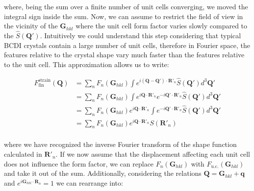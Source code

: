 where, being the sum over a finite number of unit cells converging, we moved the integral sign inside the sum. 
Now, we can assume to restrict the field of view in the vicinity of the $\mathbf{G}_{hkl}$ where the unit cell 
form factor varies slowly compared to the $\widehat{S}(\mathbf{Q'})$. Intuitively we could understand this step considering 
that typical BCDI crystals contain a large number of unit cells, therefore in Fourier space, the features relative to 
the crystal shape vary much faster than the features relative to the unit cell. This approximation allows us to write:

\begin{equation}
    \begin{aligned}
    F^{\text{strain}}_{\text{fin}}(\mathbf{Q}) &=  
    \sum_{n} F_n(\mathbf{G}_{hkl}) \int  e^{i (\mathbf{Q} -\mathbf{Q'}) \cdot \mathbf{R}'_n} \widehat{S}(\mathbf{Q'})d^3\mathbf{Q'} \\ 
    &= \sum_{n} F_n(\mathbf{G}_{hkl}) \int  e^{i \mathbf{Q} \cdot \mathbf{R}'_n } e^{-i \mathbf{Q'} \cdot \mathbf{R}'_n} \widehat{S}(\mathbf{Q'})d^3\mathbf{Q'} \\ 
    &= \sum_{n} F_n(\mathbf{G}_{hkl}) e^{i \mathbf{Q} \cdot \mathbf{R}'_n } \int e^{-i \mathbf{Q'} \cdot \mathbf{R}'_n} \widehat{S}(\mathbf{Q'})d^3\mathbf{Q'} \\ 
    &= \sum_{n} F_n(\mathbf{G}_{hkl}) e^{i \mathbf{Q} \cdot \mathbf{R}'_n } S(\mathbf{R}'_n) \\
   \label{eq:strain_fin3}
    \end{aligned}
\end{equation}

where we have recognized the inverse Fourier transform of the shape function calculated in $\mathbf{R}'_n$. 
If we now assume that the displacement affecting each unit cell does not influence the form factor, 
we can replace $F_n(\mathbf{G}_{hkl})$ with $F_{\text{u.c.}}(\mathbf{G}_{hkl})$ and take it out of the sum. 
Additionally, considering the relations $\mathbf{Q} = \mathbf{G}_{hkl} + \mathbf{q}$ and $e^{i \mathbf{G}_{hkl} \cdot \mathbf{R}_n}  = 1$
we can rearrange into: 


